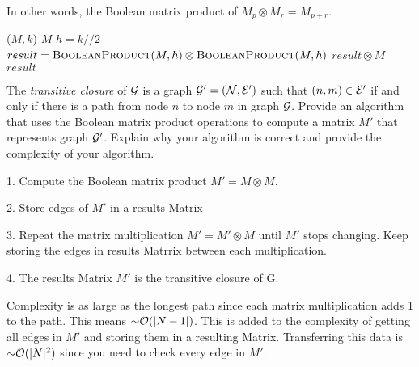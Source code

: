 \begin{problem}
\begin{questions}
In other words, the Boolean matrix product of $M_p \otimes M_r = M_{p+r}$.


\begin{myalgo}{($M, k$)}
    \RETURN $M$
  \ENDIF
  \STATE $h = k//2$
  \STATE $result = \textsc{BooleanProduct}(M, h) \otimes \textsc{BooleanProduct}(M, h)$ 
    \STATE $result \otimes M$ 
  \ENDIF
  \RETURN $result$
\end{myalgo}


\item The \emph{transitive closure} of $\mathcal{G}$ is a graph $\mathcal{G}' = (\mathcal{N}, \mathcal{E}')$ such that $(n, m) \in \mathcal{E}'$ if and only if there is a path from node $n$ to node $m$ in graph $\mathcal{G}$. Provide an algorithm that uses the Boolean matrix product operations to compute a matrix $M'$ that represents graph $\mathcal{G}'$. Explain why your algorithm is correct and provide the complexity of your algorithm.

1. Compute the Boolean matrix product $M' = M \otimes M$.

2. Store edges of $M'$ in a results Matrix

3. Repeat the matrix multiplication $M' = M' \otimes M$ until $M'$ stops changing. Keep storing the edges in results Matrrix between each multiplication.

4. The results Matrix $M'$ is the transitive closure of G.

Complexity is as large as the longest path since each matrix multiplication adds 1 to the path. This means $\mathord{\sim}\mathcal{O}(|N-1|)$. 
This is added to the complexity of getting all edges in $M'$ and storing them in a resulting Matrix. Transferring this data is $\mathord{\sim}\mathcal{O}(|N|^2)$ since you need to check every edge in $M'$.

\end{questions}
\end{problem}

